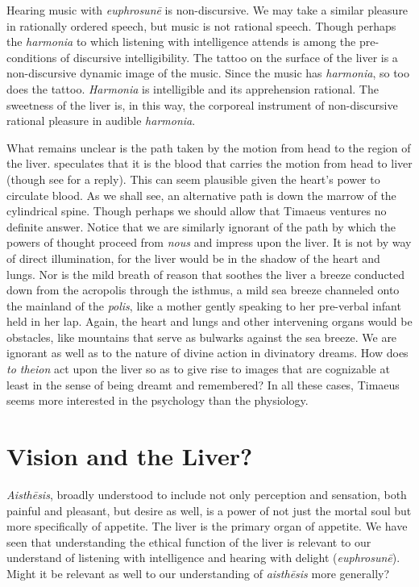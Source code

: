 Hearing music with \emph{euphrosunē} is non-discursive. We may take a similar pleasure in rationally ordered speech, but music is not rational speech. Though perhaps the \emph{harmonia} to which listening with intelligence attends is among the pre-conditions of discursive intelligibility. The tattoo on the surface of the liver is a non-discursive dynamic image of the music. Since the music has \emph{harmonia}, so too does the tattoo. \emph{Harmonia} is intelligible and its apprehension rational. The sweetness of the liver is, in this way, the corporeal instrument of non-discursive rational pleasure in audible \emph{harmonia}.

What remains unclear is the path taken by the motion from head to the region of the liver. \citet{Brisson:1997qr} speculates that it is the blood that carries the motion from head to liver (though see \citealt{Miller:1997up} for a reply). This can seem plausible given the heart's power to circulate blood. As we shall see, an alternative path is down the marrow of the cylindrical spine. Though perhaps we should allow that Timaeus ventures no definite answer. Notice that we are similarly ignorant of the path by which the powers of thought proceed from \emph{nous} and impress upon the liver. It is not by way of direct illumination, for the liver would be in the shadow of the heart and lungs. Nor is the mild breath of reason that soothes the liver a breeze conducted down from the acropolis through the isthmus, a mild sea breeze channeled onto the mainland of the \emph{polis}, like a mother gently speaking to her pre-verbal infant held in her lap. Again, the heart and lungs and other intervening organs would be obstacles, like mountains that serve as bulwarks against the sea breeze. We are ignorant as well as to the nature of divine action in divinatory dreams. How does \emph{to theion} act upon the liver so as to give rise to images that are cognizable at least in the sense of being dreamt and remembered? In all these cases, Timaeus seems more interested in the psychology than the physiology.


\section{Vision and the Liver?} %
\label{sec:vision_and_the_liver}

\emph{Aisthēsis}, broadly understood to include not only perception and sensation, both painful and pleasant, but desire as well, is a power of not just the mortal soul but more specifically of appetite. The liver is the primary organ of appetite. We have seen that understanding the ethical function of the liver is relevant to our understand of listening with intelligence and hearing with delight (\emph{euphrosunē}). Might it be relevant as well to our understanding of \emph{aisthēsis} more generally?

